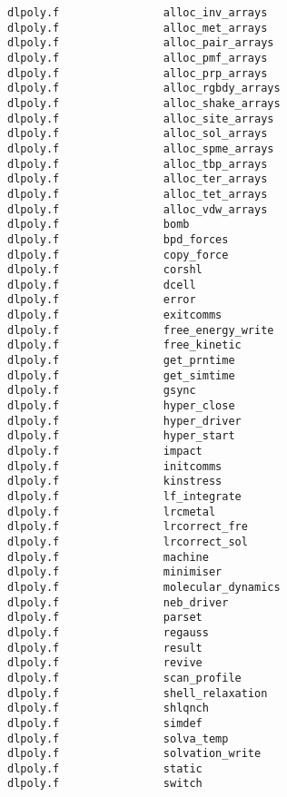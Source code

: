 \begin{verbatim}
dlpoly.f                alloc_inv_arrays          
dlpoly.f                alloc_met_arrays          
dlpoly.f                alloc_pair_arrays         
dlpoly.f                alloc_pmf_arrays          
dlpoly.f                alloc_prp_arrays          
dlpoly.f                alloc_rgbdy_arrays        
dlpoly.f                alloc_shake_arrays        
dlpoly.f                alloc_site_arrays         
dlpoly.f                alloc_sol_arrays          
dlpoly.f                alloc_spme_arrays         
dlpoly.f                alloc_tbp_arrays          
dlpoly.f                alloc_ter_arrays          
dlpoly.f                alloc_tet_arrays          
dlpoly.f                alloc_vdw_arrays          
dlpoly.f                bomb                      
dlpoly.f                bpd_forces                
dlpoly.f                copy_force                
dlpoly.f                corshl                    
dlpoly.f                dcell                     
dlpoly.f                error                     
dlpoly.f                exitcomms                 
dlpoly.f                free_energy_write     
dlpoly.f                free_kinetic          
dlpoly.f                get_prntime               
dlpoly.f                get_simtime               
dlpoly.f                gsync                     
dlpoly.f                hyper_close               
dlpoly.f                hyper_driver              
dlpoly.f                hyper_start               
dlpoly.f                impact                    
dlpoly.f                initcomms                 
dlpoly.f                kinstress                 
dlpoly.f                lf_integrate              
dlpoly.f                lrcmetal                  
dlpoly.f                lrcorrect_fre             
dlpoly.f                lrcorrect_sol             
dlpoly.f                machine                   
dlpoly.f                minimiser                 
dlpoly.f                molecular_dynamics        
dlpoly.f                neb_driver                
dlpoly.f                parset                    
dlpoly.f                regauss                   
dlpoly.f                result                    
dlpoly.f                revive                    
dlpoly.f                scan_profile          
dlpoly.f                shell_relaxation      
dlpoly.f                shlqnch               
dlpoly.f                simdef                
dlpoly.f                solva_temp            
dlpoly.f                solvation_write       
dlpoly.f                static                
dlpoly.f                switch                

\end{verbatim}
